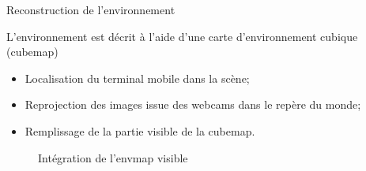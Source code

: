 \documentclass{beamer}
\newcommand*{\rootPath}{}
\begin{document}

\begin{frame}{Reconstruction de l'environnement}

	L'environnement est décrit à l'aide d'une carte d'environnement cubique (cubemap)
	
	\begin{minipage}{.45\textwidth}
		\begin{itemize}
			\item Localisation du terminal mobile dans la scène;
			\item Reprojection des images issue des webcams dans le repère du monde;
			\item Remplissage de la partie visible de la cubemap.
		\end{itemize}
	\end{minipage}
	\hfill
	\begin{minipage}{.45\textwidth}
		\begin{figure}[!ht]\centering
			
			\caption{Intégration de l'envmap visible}
		\end{figure}	
	\end{minipage}
	
\end{frame}
\end{document}
